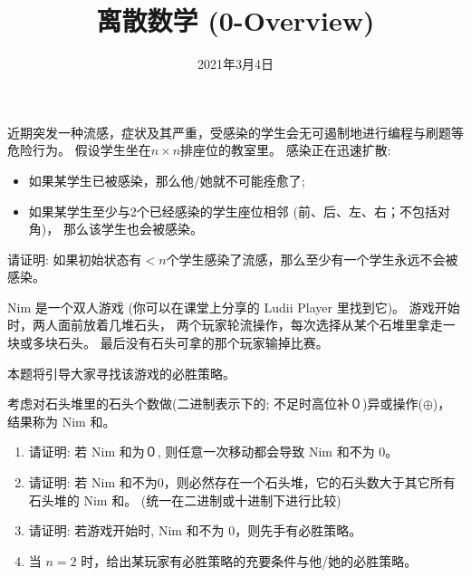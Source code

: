 \documentclass[a4paper, justified]{tufte-handout}
\title{离散数学 (0-Overview)}
\date{2021年3月4日}
\begin{document}
\maketitle
\noplagiarism %
\begin{abstract}
\end{abstract}
\beginrequired
\begin{problem}
  近期突发一种流感，症状及其严重，受感染的学生会无可遏制地进行编程与刷题等危险行为。
  假设学生坐在$n \times n$排座位的教室里。
  感染正在迅速扩散:
  \begin{itemize}
    \item 如果某学生已被感染，那么他/她就不可能痊愈了;
    \item 如果某学生至少与2个已经感染的学生座位相邻 (前、后、左、右；不包括对角)，
      那么该学生也会被感染。
  \end{itemize}
  请证明: 如果初始状态有$< n$个学生感染了流感，那么至少有一个学生永远不会被感染。
\end{problem}

\begin{solution}
\end{solution}

\begin{problem}[Nim Game \score{6 = 1 + 2 + 2 + 1}]
  Nim 是一个双人游戏 (你可以在课堂上分享的 Ludii Player 里找到它)。
  游戏开始时，两人面前放着几堆石头，
  两个玩家轮流操作，每次选择从某个石堆里拿走一块或多块石头。
  最后没有石头可拿的那个玩家输掉比赛。


  本题将引导大家寻找该游戏的必胜策略。

  考虑对石头堆里的石头个数做(二进制表示下的; 不足时高位补０)异或操作($\oplus$)，
  结果称为 Nim 和。

  \begin{enumerate}[(1)]
    \item 请证明: 若 Nim 和为０, 则任意一次移动都会导致 Nim 和不为 0。
    \item 请证明: 若 Nim 和不为0，则必然存在一个石头堆，它的石头数大于其它所有石头堆的 Nim 和。
      (统一在二进制或十进制下进行比较)
    \item 请证明: 若游戏开始时, Nim 和不为 0，则先手有必胜策略。
    \item 当 $n = 2$ 时，给出某玩家有必胜策略的充要条件与他/她的必胜策略。
  \end{enumerate}
\end{problem}
\end{document}

